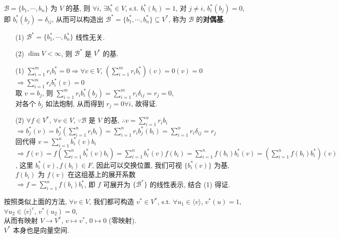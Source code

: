 \documentclass{note}
\begin{document}
\begin{df}[对偶基]
    $\mathcal{B}=\{b_1,\cdots,b_n\}$ 为 $V$ 的基, 则 $\forall i$, $\exists b_i^*\in V$, s.t. $b_i^*(b_i)=1$, 对 $j\neq i$, $b_i^*(b_j)=0$, 即 $b_i^*(b_j)=\delta_{ij}$, 从而可以构造出 $\mathcal{B}^*=\{b_1^*,\cdots,b_n^*\}\subseteq V^*$, 称为 $\mathcal{B}$ 的\textbf{对偶基}.
\end{df}

\begin{thm}[(课本定理 3.12)]
    \begin{itemize}
        \item[(1)] $\mathcal{B}^*=\{b_1^*,\cdots,b_n^*\}$ 线性无关.
        \item[(2)] $\dim V<\infty$, 则 $\mathcal{B}^*$ 是 $V^*$ 的基.
    \end{itemize}
\end{thm}
\begin{pf}
    \begin{itemize}
        \item[(1)] $\sum_{i=1}^mr_ib_i^*=0\Longrightarrow\forall v\in V$, $\left(\sum_{i=1}^mr_ib_i^*\right)(v)=0(v)=0$\\
        $\Longrightarrow\sum_{i=1}^mr_ib_i^*(v)=0$\\
        取 $v=b_j$, 则 $\sum_{i=1}^mr_ib_i^*(b_j)=\sum_{i=1}^mr_i\delta_{ij}=r_j=0$,\\
        对各个 $b_j$ 如法炮制, 从而得到 $r_j=0\forall i$, 故得证.
        \item[(2)] $\forall f\in V^*$, $\forall v\in V$, $\because\mathcal{B}$ 是 $V$ 的基, $\therefore v=\sum_{i=1}^nr_ib_i$\\
        $\Longrightarrow b_j^*(v)=b_j^*\left(\sum_{i=1}^nr_ib_i\right)=\sum_{i=1}^nr_ib_j^*(b_i)=\sum_{i=1}^nr_i\delta_{ij}=r_j$\\
        回代得 $v=\sum_{i=1}^nb_i^*(v)b_i$\\
        $\Longrightarrow f(v)=f\left(\sum_{i=1}^nb_i^*(v)b_i\right)=\sum_{i=1}^nb_i^*(v)f(b_i)=\sum_{i=1}^nf(b_i)b_i^*(v)=\left(\sum_{i=1}^nf(b_i)b_i^*\right)(v)$, 这里 $b_i^*(v),f(b_i)\in F$, 因此可以交换位置, 我们可视 $\{b_i^*(v)\}$ 为基, $f(b_i)$ 为 $f(v)$ 在这组基上的展开系数\\
        $\Longrightarrow f=\sum_{i=1}^nf(b_i)b_i^*$, 即 $f$ 可展开为 $\{\mathcal{B}^*\}$ 的线性表示, 结合 (1) 得证.
    \end{itemize}
\end{pf}

按照类似上面的方法, $\forall v\in V$, 我们都可构造 $v^*\in V^*$, s.t. $\forall u_1\in\langle v\rangle$, $v^*(u)=1$, $\forall u_2\in\langle v\rangle^c$, $v^*(u_2)=0$,\\
从而有映射 $V\rightarrow V^*$, $v\mapsto v^*$, $0\mapsto 0$ (零映射).\\
$V^*$ 本身也是向量空间.
\end{document}
